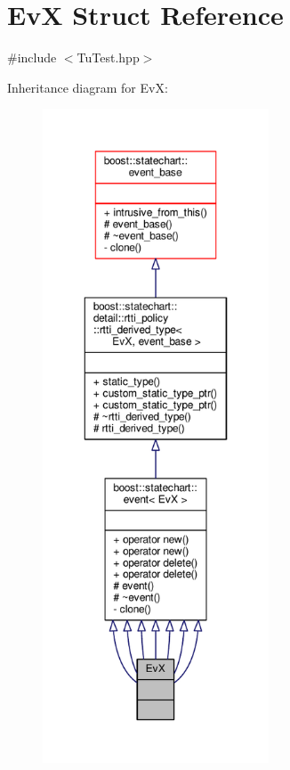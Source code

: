\hypertarget{struct_ev_x}{}\section{EvX Struct Reference}
\label{struct_ev_x}


{\ttfamily \#include $<$Tu\+Test.\+hpp$>$}



Inheritance diagram for EvX\+:
\nopagebreak
\begin{figure}[H]
\begin{center}
\leavevmode
\includegraphics[height=550pt]{struct_ev_x__inherit__graph}
\end{center}
\end{figure}


